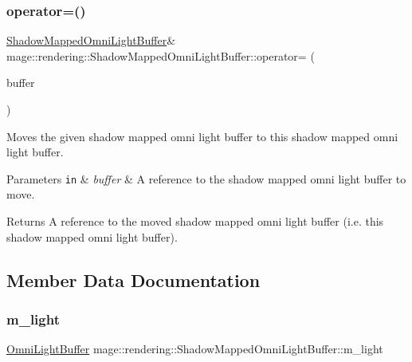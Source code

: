 \subsubsection{\texorpdfstring{operator=()}{operator=()}\hspace{0.1cm}{\footnotesize\ttfamily [2/2]}}
{\footnotesize\ttfamily \mbox{\hyperlink{structmage_1_1rendering_1_1_shadow_mapped_omni_light_buffer}{Shadow\+Mapped\+Omni\+Light\+Buffer}}\& mage\+::rendering\+::\+Shadow\+Mapped\+Omni\+Light\+Buffer\+::operator= (\begin{DoxyParamCaption}\item[{\mbox{\hyperlink{structmage_1_1rendering_1_1_shadow_mapped_omni_light_buffer}{Shadow\+Mapped\+Omni\+Light\+Buffer}} \&\&}]{buffer }\end{DoxyParamCaption})\hspace{0.3cm}{\ttfamily [default]}}

Moves the given shadow mapped omni light buffer to this shadow mapped omni light buffer.


\begin{DoxyParams}[1]{Parameters}
\mbox{\tt in}  & {\em buffer} & A reference to the shadow mapped omni light buffer to move. \\
\hline
\end{DoxyParams}
\begin{DoxyReturn}{Returns}
A reference to the moved shadow mapped omni light buffer (i.\+e. this shadow mapped omni light buffer). 
\end{DoxyReturn}


\subsection{Member Data Documentation}
\mbox{\label{structmage_1_1rendering_1_1_shadow_mapped_omni_light_buffer_a6b316ed6c8b69d5aeb15fbe93c23de95}} 
\subsubsection{\texorpdfstring{m\+\_\+light}{m\_light}}
{\footnotesize\ttfamily \mbox{\hyperlink{structmage_1_1rendering_1_1_omni_light_buffer}{Omni\+Light\+Buffer}} mage\+::rendering\+::\+Shadow\+Mapped\+Omni\+Light\+Buffer\+::m\+\_\+light}

